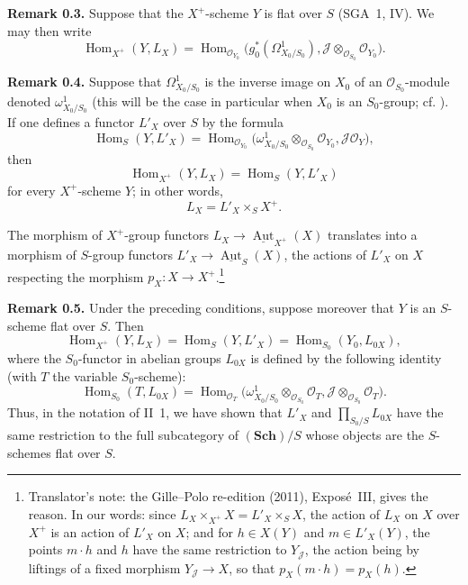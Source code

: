 

\medskip
\noindent{}\textbf{Remark 0.3.}
Suppose that the \(X^+\)-scheme \(Y\) is flat over \(S\) (SGA~1,
IV). We may then write
\[
 \operatorname{Hom}_{X^+}(Y,L_X)
 =
 \operatorname{Hom}_{\mathscr O_{Y_0}}
 \bigl(g_0^*(\Omega^1_{X_0/S_0}),
       \mathscr J\otimes_{\mathscr O_{S_0}}\mathscr O_{Y_0}\bigr).
\]

\medskip
\noindent{}\textbf{Remark 0.4.}
Suppose that \(\Omega^1_{X_0/S_0}\) is the inverse image on \(X_0\) of
an \(\mathscr O_{S_0}\)-module denoted \(\omega^1_{X_0/S_0}\) (this will be
the case in particular when \(X_0\) is an \(S_0\)-group; cf.
). If one defines a functor \(L'_X\) over \(S\) by the
formula
\[
 \operatorname{Hom}_S(Y,L'_X)
 =
 \operatorname{Hom}_{\mathscr O_{Y_0}}
 \bigl(\omega^1_{X_0/S_0}\otimes_{\mathscr O_{S_0}}\mathscr O_{Y_0},
       \mathscr J\mathscr O_Y\bigr),
\]
then
\[
 \operatorname{Hom}_{X^+}(Y,L_X)=\operatorname{Hom}_S(Y,L'_X)
\]
for every \(X^+\)-scheme \(Y\); in other words,
\[
 L_X=L'_X\mathbin{\times_S}X^+.
\]

The morphism of \(X^+\)-group functors
\(L_X\to\underline{\operatorname{Aut}}_{X^+}(X)\) translates into a morphism
of \(S\)-group functors \(L'_X\to\underline{\operatorname{Aut}}_S(X)\), the
actions of \(L'_X\) on \(X\) respecting the morphism \(p_X:X\to X^+\).\footnote{Translator's note: the Gille--Polo re-edition (2011), Exposé~III, gives
the reason. In our words: since \(L_X\times_{X^+}X=L'_X\times_SX\), the action
of \(L_X\) on \(X\) over \(X^+\) is an action of \(L'_X\) on \(X\); and for
\(h\in X(Y)\) and \(m\in L'_X(Y)\), the points \(m\cdot h\) and \(h\) have the
same restriction to \(Y_{\mathscr J}\), the action being by liftings of a
fixed morphism \(Y_{\mathscr J}\to X\), so that \(p_X(m\cdot h)=p_X(h)\).}

\medskip
\noindent{}\textbf{Remark 0.5.}
Under the preceding conditions, suppose moreover that
\(Y\) is an \(S\)-scheme flat over \(S\). Then
\[
 \operatorname{Hom}_{X^+}(Y,L_X)
 =\operatorname{Hom}_S(Y,L'_X)
 =\operatorname{Hom}_{S_0}(Y_0,L_{0X}),
\]
where the \(S_0\)-functor in abelian groups \(L_{0X}\) is defined by
the following identity (with \(T\) the variable \(S_0\)-scheme):
\[
 \operatorname{Hom}_{S_0}(T,L_{0X})
 =
 \operatorname{Hom}_{\mathscr O_T}
 \bigl(\omega^1_{X_0/S_0}\otimes_{\mathscr O_{S_0}}\mathscr O_T,
       \mathscr J\otimes_{\mathscr O_{S_0}}\mathscr O_T\bigr).
\]
Thus, in the notation of II~1, we have shown that \(L'_X\) and
\(\prod_{S_0/S}L_{0X}\) have the same restriction to the full
subcategory of \((\mathbf{Sch})/S\) whose objects are the \(S\)-schemes
flat over \(S\).

